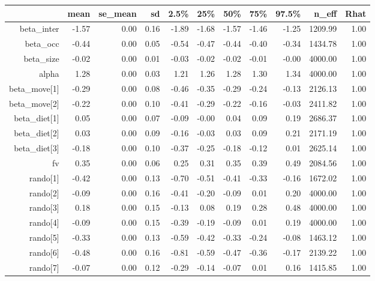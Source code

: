 \begin{table}[ht]
\centering
\begin{tabular}{rrrrrrrrrrr}
  \hline
 & mean & se\_mean & sd & 2.5\% & 25\% & 50\% & 75\% & 97.5\% & n\_eff & Rhat \\ 
  \hline
beta\_inter & -1.57 & 0.00 & 0.16 & -1.89 & -1.68 & -1.57 & -1.46 & -1.25 & 1209.99 & 1.00 \\ 
  beta\_occ & -0.44 & 0.00 & 0.05 & -0.54 & -0.47 & -0.44 & -0.40 & -0.34 & 1434.78 & 1.00 \\ 
  beta\_size & -0.02 & 0.00 & 0.01 & -0.03 & -0.02 & -0.02 & -0.01 & -0.00 & 4000.00 & 1.00 \\ 
  alpha & 1.28 & 0.00 & 0.03 & 1.21 & 1.26 & 1.28 & 1.30 & 1.34 & 4000.00 & 1.00 \\ 
  beta\_move[1] & -0.29 & 0.00 & 0.08 & -0.46 & -0.35 & -0.29 & -0.24 & -0.13 & 2126.13 & 1.00 \\ 
  beta\_move[2] & -0.22 & 0.00 & 0.10 & -0.41 & -0.29 & -0.22 & -0.16 & -0.03 & 2411.82 & 1.00 \\ 
  beta\_diet[1] & 0.05 & 0.00 & 0.07 & -0.09 & -0.00 & 0.04 & 0.09 & 0.19 & 2686.37 & 1.00 \\ 
  beta\_diet[2] & 0.03 & 0.00 & 0.09 & -0.16 & -0.03 & 0.03 & 0.09 & 0.21 & 2171.19 & 1.00 \\ 
  beta\_diet[3] & -0.18 & 0.00 & 0.10 & -0.37 & -0.25 & -0.18 & -0.12 & 0.01 & 2625.14 & 1.00 \\ 
  fv & 0.35 & 0.00 & 0.06 & 0.25 & 0.31 & 0.35 & 0.39 & 0.49 & 2084.56 & 1.00 \\ 
  rando[1] & -0.42 & 0.00 & 0.13 & -0.70 & -0.51 & -0.41 & -0.33 & -0.16 & 1672.02 & 1.00 \\ 
  rando[2] & -0.09 & 0.00 & 0.16 & -0.41 & -0.20 & -0.09 & 0.01 & 0.20 & 4000.00 & 1.00 \\ 
  rando[3] & 0.18 & 0.00 & 0.15 & -0.13 & 0.08 & 0.19 & 0.28 & 0.48 & 4000.00 & 1.00 \\ 
  rando[4] & -0.09 & 0.00 & 0.15 & -0.39 & -0.19 & -0.09 & 0.01 & 0.19 & 4000.00 & 1.00 \\ 
  rando[5] & -0.33 & 0.00 & 0.13 & -0.59 & -0.42 & -0.33 & -0.24 & -0.08 & 1463.12 & 1.00 \\ 
  rando[6] & -0.48 & 0.00 & 0.16 & -0.81 & -0.59 & -0.47 & -0.36 & -0.17 & 2139.22 & 1.00 \\ 
  rando[7] & -0.07 & 0.00 & 0.12 & -0.29 & -0.14 & -0.07 & 0.01 & 0.16 & 1415.85 & 1.00 \\ 

\end{tabular}
\end{table}
